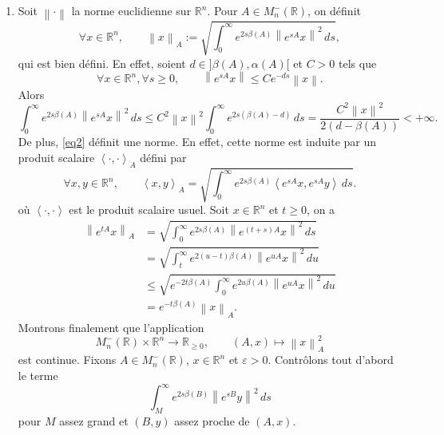 \documentclass[french]{article}
\theoremstyle{definition}
\newcommand{\norm}[1]{\left\|#1\right\|}
\newcommand{\sprod}[1]{\left<#1\right>}
\newcommand{\Rbb}{\mathbb{R}}
\begin{document}
\begin{enumerate}
    \item \label{Partie12} Soit $\norm{\cdot}$ la norme euclidienne sur $\Rbb^n$. Pour $A \in M^-_n(\Rbb)$, on d\'efinit
        \begin{equation} \label{eq2}
            \forall x \in \Rbb^n, \qquad \norm{x}_A:= \sqrt{\int_{0}^\infty e^{2s\beta(A)} \norm{e^{sA}x}^2 \, ds},
        \end{equation}
    qui est bien d\'efini. En effet, soient $d \in ]\beta(A),\alpha(A)[$ et $C > 0$ tels que
        $$\forall x \in \Rbb^n,\forall s \ge 0, \qquad \norm{e^{sA}x} \le Ce^{-ds}\norm{x}.$$
    Alors 
        $$\int_{0}^\infty e^{2s\beta(A)} \norm{e^{sA}x}^2 \, ds \le C^2\norm{x}^2 \int_{0}^\infty e^{2s(\beta(A) - d)}\,ds = \frac{C^2\norm{x}^2}{2(d - \beta(A))} < +\infty.$$
    De plus, \eqref{eq2} d\'efinit une norme. En effet, cette norme est induite par un produit scalaire $\sprod{\cdot,\cdot}_A$ d\'efini par
        $$\forall x,y \in \Rbb^n, \qquad \sprod{x,y}_A = \sqrt{\int_{0}^\infty e^{2s\beta(A)} \sprod{e^{sA}x,e^{sA}y} \, ds}.$$
    o\`u $\sprod{\cdot,\cdot}$ est le produit scalaire usuel. Soit $x \in \Rbb^n$ et $t \ge 0$, on a
        \begin{align*}
            \norm{e^{tA}x}_A & = \sqrt{\int_{0}^\infty e^{2s\beta(A)} \norm{e^{(t+s)A}x}^2 \, ds} \\
            & =  \sqrt{\int_{t}^\infty e^{2(u - t)\beta(A)} \norm{e^{uA}x}^2 \, du} \\
            & \le  \sqrt{e^{-2t\beta(A)}\int_{0}^\infty e^{2u\beta(A)} \norm{e^{uA}x}^2 \, du} \\
            & = e^{-t\beta(A)}\norm{x}_A.
        \end{align*}
    Montrons finalement que l'application 
        $$M_n^{-}(\Rbb) \times \Rbb^n \to \Rbb_{\ge 0},\qquad (A,x) \mapsto \norm{x}_A^2$$
    est continue. Fixons $A \in M_n^-(\Rbb)$, $x \in \Rbb^n$ et $\varepsilon > 0$. Contr\^olons tout d'abord le terme 
        $$\int_M^\infty e^{2s\beta(B)}\norm{e^{sB}y}^2\,ds$$
    pour $M$ assez grand et $(B,y)$ assez proche de $(A,x)$.
   

\end{enumerate}
\end{document}

